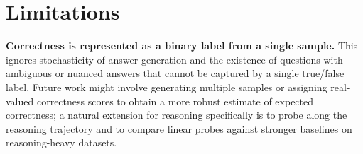 \documentclass{article} %
\begin{document}

\section{Limitations}
\label{sec:limitations}


\textbf{Correctness is represented as a binary label from a single sample.} This ignores  stochasticity of answer generation and the existence of questions with ambiguous or nuanced answers that cannot be captured by a single true/false label. Future work might involve generating multiple samples or assigning real-valued correctness scores to obtain a more robust estimate of expected correctness; a natural extension for reasoning specifically is to probe along the reasoning trajectory and to compare linear probes against stronger baselines on reasoning-heavy datasets.
\end{document}
